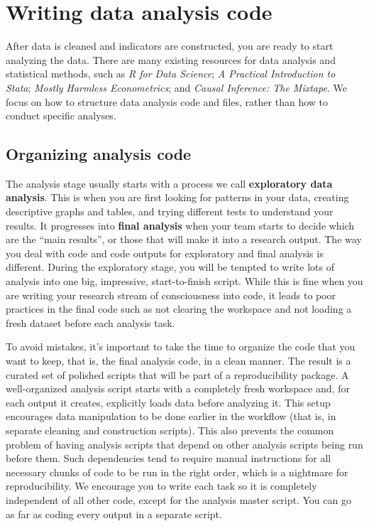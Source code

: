 
\section{Writing data analysis code}

After data is cleaned and indicators are constructed, you are ready to start analyzing the data.
There are many existing resources for data analysis and statistical methods, such as
\textit{R for Data Science};\cite{hadley2017R}
\textit{A Practical Introduction to Stata};\cite{RePEc:gdm:wpaper:9412}
\textit{Mostly Harmless Econometrics};\cite{angrist2008mostly}
and \textit{Causal Inference: The Mixtape}.
We focus on how to structure data analysis code and files, rather than how to conduct specific analyses.

\subsection{Organizing analysis code}

The analysis stage usually starts with a process we call \textbf{exploratory data analysis}.
This is when you are first looking for patterns in your data,
creating descriptive graphs and tables,
and trying different tests to understand your results.
It progresses into \textbf{final analysis} when your team starts to decide which are the ``main results'', or
those that will make it into a research output.
The way you deal with code and code outputs for exploratory and final analysis is different.
During the exploratory stage,
you will be tempted to write lots of analysis into one big, impressive, start-to-finish script.
While this is fine when you are writing your research stream of consciousness into code,
it leads to poor practices in the final code such as not clearing the workspace
and not loading a fresh dataset before each analysis task.

To avoid mistakes, it's important to take the time
to organize the code that you want to keep, that is,
the final analysis code, in a clean manner.
The result is a curated set of polished scripts that
will be part of a reproducibility package.
A well-organized analysis script starts with a completely fresh workspace
and, for each output it creates, explicitly loads data before analyzing it.
This setup encourages data manipulation to be done earlier in the workflow
(that is, in separate cleaning and construction scripts).
This also prevents the common problem of having analysis scripts 
that depend on other analysis scripts being run before them.
Such dependencies tend to require manual instructions 
for all necessary chunks of code to be run in the right order,
which is a nightmare for reproducibility.
We encourage you to write each task so 
it is completely independent of all other code,
except for the analysis master script.
You can go as far as coding every output in a separate script.

